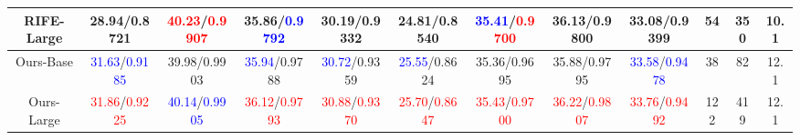 \documentclass[sigconf]{acmart}
\begin{document}
\begin{table*}
{\begin{tabular}{c c c c c c c c c c c c}
		RIFE-Large & 28.94/0.8721 & \textcolor{red}{40.23}/\textcolor{red}{0.9907}  & 35.86/\textcolor{blue}{0.9792} & 30.19/0.9332 & 24.81/0.8540 & \textcolor{blue}{35.41}/\textcolor{red}{0.9700} & 36.13/0.9800 & 33.08/0.9399 & 54 & 350 & 10.1 \\
		
	    \midrule Ours-Base  &  \textcolor{blue}{31.63}/\textcolor{blue}{0.9185} &
		39.98/0.9903 & \textcolor{blue}{35.94}/0.9788 & \textcolor{blue}{30.72}/0.9359 & \textcolor{blue}{25.55}/0.8624& 35.36/0.9695& 35.88/0.9795 & 
		\textcolor{blue}{33.58}/\textcolor{blue}{0.9478} &
		38 & 82 & 12.1 \\
		
		Ours-Large  &  \textcolor{red}{31.86}/\textcolor{red}{0.9225} & \textcolor{blue}{40.14}/\textcolor{blue}{0.9905} & \textcolor{red}{36.12}/\textcolor{red}{0.9793} & \textcolor{red}{30.88}/\textcolor{red}{0.9370} & \textcolor{red}{25.70}/\textcolor{red}{0.8647} & \textcolor{red}{35.43}/\textcolor{red}{0.9700} & \textcolor{red}{36.22}/\textcolor{red}{0.9807} &
		\textcolor{red}{33.76}/\textcolor{red}{0.9492}  &
		122 & 419 & 12.1 \\
	    \midrule 

	\end{tabular}
	}
\end{table*}
\end{document}
